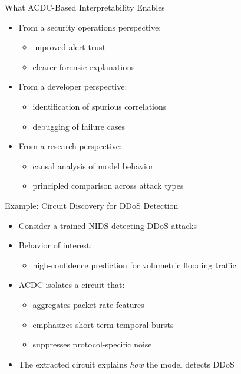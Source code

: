 \documentclass{beamer}
\begin{document}
	\begin{frame}{What ACDC-Based Interpretability Enables}
		\begin{itemize}
			\item From a security operations perspective:
			\begin{itemize}
				\item improved alert trust
				\item clearer forensic explanations
			\end{itemize}
			\item From a developer perspective:
			\begin{itemize}
				\item identification of spurious correlations
				\item debugging of failure cases
			\end{itemize}
			\item From a research perspective:
			\begin{itemize}
				\item causal analysis of model behavior
				\item principled comparison across attack types
			\end{itemize}
		\end{itemize}
	\end{frame}
	
	\begin{frame}{Example: Circuit Discovery for DDoS Detection}
		\begin{itemize}
			\item Consider a trained NIDS detecting DDoS attacks
			\item Behavior of interest:
			\begin{itemize}
				\item high-confidence prediction for volumetric flooding traffic
			\end{itemize}
			\item ACDC isolates a circuit that:
			\begin{itemize}
				\item aggregates packet rate features
				\item emphasizes short-term temporal bursts
				\item suppresses protocol-specific noise
			\end{itemize}
			\item The extracted circuit explains \emph{how} the model detects DDoS
		\end{itemize}
	\end{frame}
	
\end{document}
